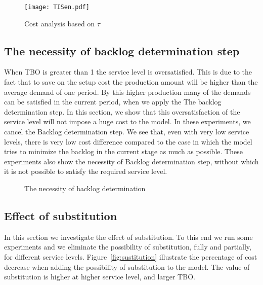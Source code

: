 \documentclass[10pt]{article}
\begin{document}
\begin{figure}[H]
\begin{center}
\texttt{[image: TISen.pdf]}
\caption{Cost analysis based on $\tau$} 
\label{fig:TISen}
\end{center}
\end{figure}


\subsection{The necessity of backlog determination step}
    When TBO is greater than 1 the service level is oversatisfied. This is due to the fact that to save on the setup cost the production amount will be higher than the average demand of one period. By this higher production many of the demands can be satisfied in the current period, when we apply the The backlog determination step. In this section, we show that this oversatisfaction of the service level will not impose a huge cost to the model. In these experiments, we cancel the Backlog determination step. We see that, even with very low service levels, there is very low cost difference compared to the case in which the model tries to minimize the backlog in the current stage as much as possible. These experiments also show the necessity of Backlog determination step, without which it is not possible to satisfy the required service level.
    
    
\begin{figure} [H]
    \centering
    \caption{The necessity of backlog determination}%
    \label{fig:BacklogDetermination}%
\end{figure}




\subsection{Effect of substitution}

In this section we investigate the effect of substitution. To this end we run some experiments and we eliminate the possibility of substitution, fully and partially, for different service levels. Figure~\ref{fig:sustitution} illustrate the percentage of cost decrease when adding the possibility of substitution to the model. The value of substitution is higher at higher service level, and larger TBO.
\end{document}
